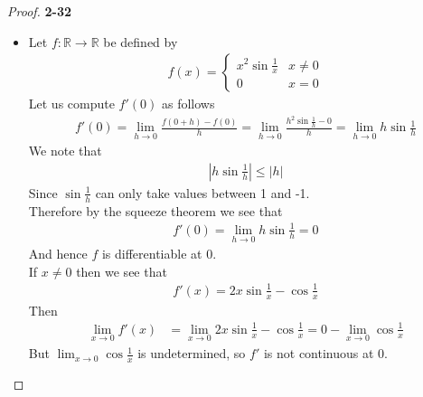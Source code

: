 \documentclass[11pt]{article}
\newcommand{\R}{\mathbb{R}}
\theoremstyle{definition}
\begin{document}
\cleardoublepage
\begin{proof}{\textbf{2-32}}\\
\begin{itemize}
\item [(a)] Let $f:\R\to \R$ be defined by
\begin{align*}
    f(x) = \begin{cases}
        x^2\sin\frac{1}{x} & x\neq 0\\
        0 & x = 0
    \end{cases}
\end{align*}
Let us compute $f'(0)$ as follows
\begin{align*}
    f'(0)
    = \lim_{h\to 0} \frac{f(0 + h) - f(0)}{h}
    = \lim_{h\to 0} \frac{h^2\sin\frac{1}{h} - 0}{h}
    =\lim_{h\to 0} h\sin\frac{1}{h}
\end{align*}
We note that
\begin{align*}
    |h\sin\frac{1}{h}| \leq |h|
\end{align*}
Since $\sin\frac{1}{h}$ can only take values between 1 and -1.\\
Therefore by the squeeze theorem we see that
\begin{align*}
    f'(0) = \lim_{h\to 0} h\sin\frac{1}{h} = 0
\end{align*}
And hence $f$ is differentiable at 0.\\
If $x \neq 0$ then we see that
\begin{align*}
    f'(x) = 2x\sin\frac{1}{x} - \cos\frac{1}{x}
\end{align*}
Then
\begin{align*}
    \lim_{x\to 0} f'(x) &= \lim_{x\to 0} 2x\sin\frac{1}{x} - \cos\frac{1}{x}
    = 0 - \lim_{x \to 0} \cos\frac{1}{x}
\end{align*}
But $\lim_{x \to 0} \cos\frac{1}{x}$ is undetermined, so $f'$ is not continuous
at 0.


\end{itemize}
\end{proof}
\end{document}
